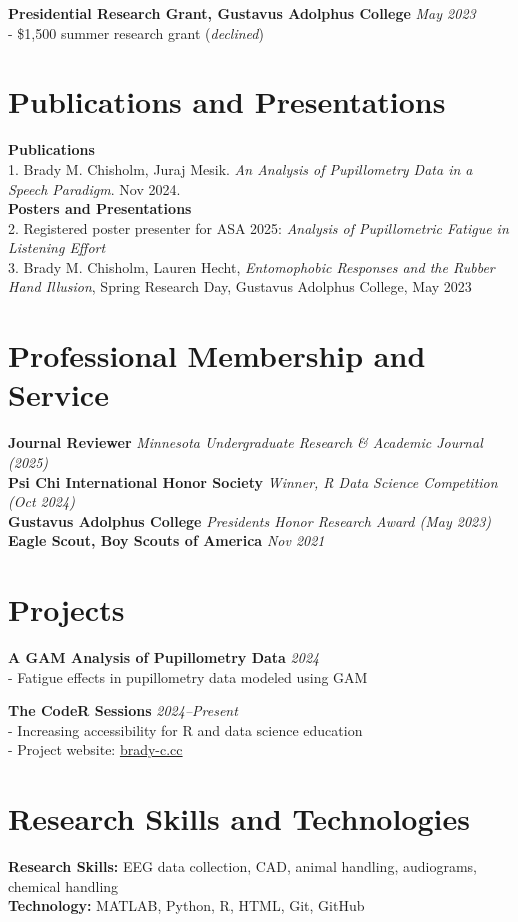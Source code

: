 \documentclass[12pt, a4paper]{article}
\begin{document}
\textbf{Presidential Research Grant, Gustavus Adolphus College} \hfill \textit{May 2023} \\
- \$1,500 summer research grant (\textit{declined})\\
\vspace{-1.8em}
\section*{Publications and Presentations}
\textbf{Publications} \\
1. Brady M. Chisholm, Juraj Mesik. \textit{An Analysis of Pupillometry Data in a Speech Paradigm}. Nov 2024.\\
\textbf{Posters and Presentations} \\
2. Registered poster presenter for ASA 2025: \textit{Analysis of Pupillometric Fatigue in Listening Effort} \\
3. Brady M. Chisholm, Lauren Hecht, \textit{Entomophobic Responses and the Rubber Hand Illusion}, Spring Research Day, Gustavus Adolphus College, May 2023\\
\vspace{-1.8em}
\section*{Professional Membership and Service}
\textbf{Journal Reviewer} \hfill \textit{Minnesota Undergraduate Research \& Academic Journal (2025)} \\
\textbf{Psi Chi International Honor Society} \hfill \textit{Winner, R Data Science Competition (Oct 2024)} \\
\textbf{Gustavus Adolphus College} \hfill \textit{Presidents Honor Research Award (May 2023)} \\
\textbf{Eagle Scout, Boy Scouts of America} \hfill \textit{Nov 2021}\\
\vspace{-1.8em}
\section*{Projects}
\textbf{A GAM Analysis of Pupillometry Data} \hfill \textit{2024} \\
- Fatigue effects in pupillometry data modeled using GAM

\textbf{The CodeR Sessions} \hfill \textit{2024--Present} \\
- Increasing accessibility for R and data science education \\
- Project website: \href{http://brady-c.cc}{brady-c.cc}

\section*{Research Skills and Technologies}
\textbf{Research Skills:} EEG data collection, CAD, animal handling, audiograms, chemical handling \\
\textbf{Technology:} MATLAB, Python, R, HTML, Git, GitHub
\end{document}
